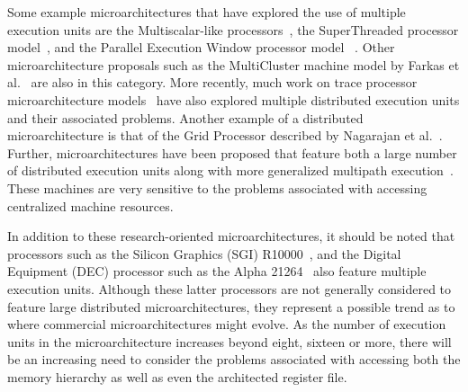 \documentclass[10pt,dvips]{article}
\begin{document}
Some example microarchitectures that have explored the
use of multiple execution units are the Multiscalar-like
processors~\cite{Sohi95,sundararaman97multiscalar},
the SuperThreaded processor model~\cite{tsai96superthread},
and
the Parallel Execution Window processor model ~\cite{kemp96pew}.
Other microarchitecture proposals such as the MultiCluster machine
model by 
Farkas et al.~\cite{farkas97multicluster} are also in this category.
More recently, much work on trace processor microarchitecture 
models~\cite{rotenberg97trace,rotenberg99control,vajapeyam97sequences}
have also explored multiple distributed execution units and their associated
problems.
Another example of a distributed microarchitecture is that
of the Grid Processor described by Nagarajan et al.~\cite{Nag01}.
Further, microarchitectures have been proposed that feature both
a large number of distributed execution units along with more
generalized multipath execution~\cite{morano02high,uht02realizing}.
These machines are very sensitive to the problems associated with accessing
centralized machine resources.

In addition to these research-oriented microarchitectures, it should
be noted that processors such as the 
Silicon Graphics (SGI) R10000~\cite{yeager96r10000}, 
and the Digital Equipment (DEC) processor such as the
Alpha 21264~\cite{Kessler98,leibholz97alpha}
also feature multiple execution units.
Although these latter processors are not generally considered to
feature large distributed microarchitectures, they represent a 
possible trend as to where commercial microarchitectures might evolve.
As the number of execution units in the microarchitecture increases
beyond eight, sixteen or more, there will be an increasing need
to consider the problems associated with accessing both
the memory hierarchy as well as even the architected register
file.
\end{document}
